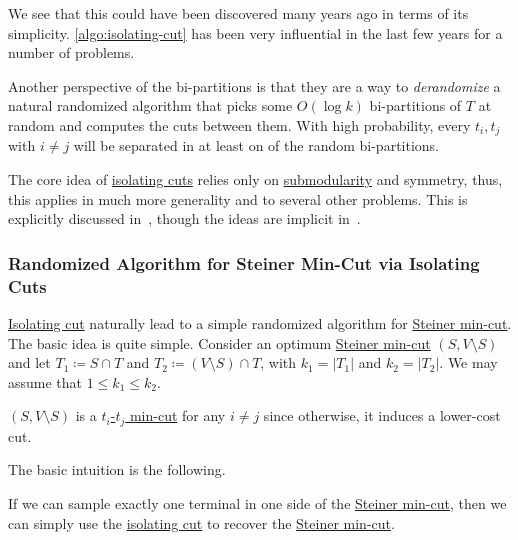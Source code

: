 We see that this could have been discovered many years ago in terms of its simplicity. \autoref{algo:isolating-cut} has been very influential in the last few years for a number of problems.

\begin{note}
	Another perspective of the bi-partitions is that they are a way to \emph{derandomize} a natural randomized algorithm that picks some \(O(\log k)\) bi-partitions of \(T\) at random and computes the cuts between them. With high probability, every \(t_i, t_j\) with \(i \neq j\) will be separated in at least on of the random bi-partitions.
\end{note}

\begin{remark}
	The core idea of \hyperref[prb:isolating-cut]{isolating cuts} relies only on \hyperref[def;submodular]{submodularity} and symmetry, thus, this applies in much more generality and to several other problems. This is explicitly discussed in~\cite{chekuri2021isolating}, though the ideas are implicit in~\cite{li2020deterministic}.
\end{remark}

\subsubsection{Randomized Algorithm for Steiner Min-Cut via Isolating Cuts}
\hyperref[prb:isolating-cut]{Isolating cut} naturally lead to a simple randomized algorithm for \hyperref[prb:Steiner-min-cut]{Steiner min-cut}. The basic idea is quite simple. Consider an optimum \hyperref[prb:Steiner-min-cut]{Steiner min-cut} \((S, V\setminus S)\) and let \(T_1 \coloneqq S \cap T\) and \(T_2 \coloneqq (V \setminus S) \cap T\), with \(k_1 = \lvert T_1 \rvert \) and \(k_2 = \lvert T_2 \rvert \). We may assume that \(1 \leq k_1 \leq k_2\).

\begin{note}
	\((S, V\setminus S)\) is a \hyperref[prb:s-t-min-cut]{\(t_i\)-\(t_j\) min-cut} for any \(i \neq j\) since otherwise, it induces a lower-cost cut.
\end{note}

The basic intuition is the following.

\begin{intuition}
	If we can sample exactly one terminal in one side of the \hyperref[prb:Steiner-min-cut]{Steiner min-cut}, then we can simply use the \hyperref[prb:isolating-cut]{isolating cut} to recover the \hyperref[prb:Steiner-min-cut]{Steiner min-cut}.
\end{intuition}

